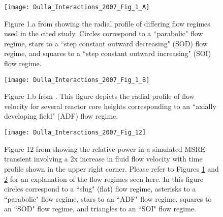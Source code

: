 \documentclass[review]{elsarticle}
\begin{document}
\begin{figure}[H]
   \centering
   \texttt{[image: Dulla\_Interactions\_2007\_Fig\_1\_A]}
   \caption{Figure 1.a from \cite{dulla_interactions_2007} showing the radial profile of
   differing flow regimes used in the cited study. Circles correspond
    to a ``parabolic" flow regime, stars to a ``step constant outward
     decreasing"
    (SOD) flow regime, and squares to a ``step constant outward increasing"
     (SOI)
    flow regime.} 
   \label{fig:dulla_flow_map}
\end{figure}

\begin{figure}[H]
   \centering
   \texttt{[image: Dulla\_Interactions\_2007\_Fig\_1\_B]}
   \caption{Figure 1.b from \cite{dulla_interactions_2007}.
   This figure depicts
   the radial profile of flow velocity for several reactor core heights
   corresponding to an ``axially developing field" (ADF) flow regime.} 
   \label{fig:dulla_flow_adf}
\end{figure}

\begin{figure}[H]
   \centering
   \texttt{[image: Dulla\_Interactions\_2007\_Fig\_12]}
   \caption{Figure 12 from \cite{dulla_interactions_2007} showing the relative power in a
   simulated MSRE transient involving a 2x increase in fluid flow velocity with time profile
   shown in the upper right corner. Please refer to
   Figures \ref{fig:dulla_flow_map} and \ref{fig:dulla_flow_adf} for an
   explanation of the flow regimes seen here. In this figure circles correspond
   to a ``slug" (flat) flow regime, asterisks to a ``parabolic" flow regime,
   stars to an
   ``ADF" flow regime, squares to an ``SOD" flow regime, and triangles to an
   ``SOI" flow regime.} 
   \label{fig:dulla_flow_regimes}
\end{figure}
\end{document}
